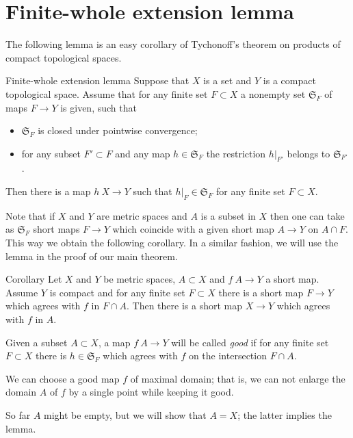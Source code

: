 \section{Finite-whole extension lemma}\label{Finite-whole extension lemma}

The following lemma is an easy corollary of Tychonoff's theorem on products of compact topological spaces.

\begin{thm}{Finite-whole extension lemma}\label{lem:finite-whole}
Suppose that $X$ is a set 
and $Y$ is a compact topological space.
Assume that for any finite set $F\subset X$ 
a nonempty set $\mathfrak{S}_F$ of maps  $F\to Y$ is given, such that
\begin{itemize}
\item $\mathfrak{S}_F$ is closed under pointwise convergence;
\item for any subset $F'\subset F$ and any map $h\in \mathfrak{S}_F$
the restriction $h|_{F'}$ belongs to $\mathfrak{S}_{F'}$. 
\end{itemize}

Then there is a map $h\: X\to Y$ such that $h|_F\in \mathfrak{S}_F$ for any finite set $F\subset X$.
\end{thm}

Note that if $X$ and $Y$ are metric spaces and $A$ is a subset in $X$
then one can take as $\mathfrak{S}_F$ short maps $F\to Y$ which coincide with a given short map $A\to Y$ on $A\cap F$.
This way we obtain the following corollary.
In a similar fashion, we will use the lemma in the proof of our main theorem.

\begin{thm}{Corollary}
Let $X$ and $Y$ be metric spaces, $A\subset X$ and $f\:A\to Y$ a short map.
Assume $Y$ is compact and for any finite set $F\subset X$ there is a short map $F\to Y$ which agrees with $f$ in $F\cap A$.
Then there is a short map $X\to Y$ which agrees with $f$ in $A$.
\end{thm}

Given a subset $A\subset X$,
a map $f\: A\to Y$ will be called \emph{good}
if for any finite set $F\subset X$
there is $h\in\mathfrak{S}_F$ which agrees with $f$ on the intersection $F\cap A$.

We can choose a good map $f$ of maximal domain;
that is, we can not enlarge the domain $A$ of $f$ by a single point while keeping it good.

So far $A$ might be empty, but we will show that $A=X$;
the latter implies the lemma.

